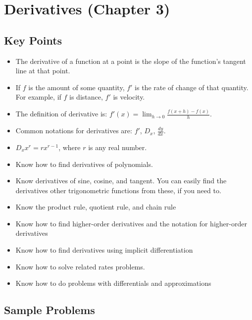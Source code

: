 \documentclass[fleqn]{exam}
\begin{document}
\pagebreak

\section{Derivatives (Chapter 3)}

\subsection{Key Points}
\begin{itemize}
\item The derivative of a function at a point is the slope of the function's tangent line at that point.
\item If $f$ is the amount of some quantity, $f'$ is the rate of change of that quantity.  For example, if $f$ is
  distance, $f'$ is velocity.
\item The definition of derivative is: $f'(x) = \lim_{h \to 0} \frac{f(x + h) - f(x)}{h}$.
\item Common notations for derivatives are: $f'$, $D_x$, $\frac{dy}{dx}$.
\item $D_x x^r = r x^{r - 1}$, where $r$ is any real number.
\item Know how to find derivatives of polynomials.
\item Know derivatives of sine, cosine, and tangent.  You can easily find the derivatives other trigonometric functions
  from these, if you need to.
\item Know the product rule, quotient rule, and chain rule
\item Know how to find higher-order derivatives and the notation for higher-order derivatives
\item Know how to find derivatives using implicit differentiation
\item Know how to solve related rates problems.  
\item Know how to do problems with differentials and approximations
\end{itemize}

\subsection{Sample Problems}
\end{document}

